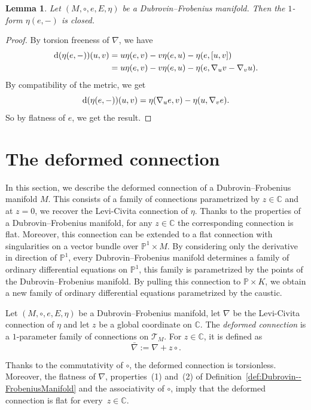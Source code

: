 \documentclass[10pt,a4paper]{amsart}
\numberwithin{equation}{section}
\newtheorem{Lemma}[Theorem]{Lemma}
\begin{document}
\begin{Lemma}
 \label{prop:Closedness}
 Let $(M,\circ,e,E,\eta)$ be a Dubrovin--Frobenius manifold. Then the $1$-form $\eta(e,-)$ is closed.
\end{Lemma}
\begin{proof}
 By torsion freeness of $\nabla$, we have
 \begin{align*}
 {\rm d}(\eta(e,-))(u,v)&=u\eta(e,v)-v\eta(e,u)-\eta(e,[u,v])\\
 &=u\eta(e,v)-v\eta(e,u)-\eta(e,\nabla_{u}v-\nabla_{v}u).
 \end{align*}
 By compatibility of the metric, we get
 \begin{equation*}
 {\rm d}(\eta(e,-))(u,v)=\eta(\nabla_{u}e,v)-\eta(u,\nabla_{v}e).
 \end{equation*}
 So by flatness of $e$, we get the result.
\end{proof}

\section{The deformed connection}
\label{sec:DeformedConnection}
In this section, we describe the deformed connection of a Dubrovin--Frobenius manifold $M$. This consists of a family of connections parametrized by $z\in\mathbb{C}$ and at $z=0$, we recover the Levi-Civita connection of $\eta$. Thanks to the properties of a Dubrovin--Frobenius manifold, for any $z\in\mathbb{C}$ the corresponding connection is flat. Moreover, this connection can be extended to a flat connection with singularities on a vector bundle over $\mathbb{P}^{1}\times M$. By considering only the derivative in direction of $\mathbb{P}^{1}$, every Dubrovin--Frobenius manifold determines a family of ordinary differential equations on $\mathbb{P}^{1}$, this family is parametrized by the points of the Dubrovin--Frobenius manifold. By pulling this connection to $\mathbb{P}\times K$, we obtain a new family of ordinary differential equations parametrized by the caustic.

\begin{Definition}
 Let $(M,\circ,e,E,\eta)$ be a Dubrovin--Frobenius manifold, let $\nabla$ be the Levi-Civita connection of $\eta$ and let $z$ be a global coordinate on $\mathbb{C}$. The \emph{deformed connection} is a $1$-parameter family of connections on $\mathcal{T}_{M}$. For $z\in\mathbb{C}$, it is defined as
 \begin{equation*}
 \bar{\nabla}:=\nabla + z\circ.
 \end{equation*}
\end{Definition}
Thanks to the commutativity of $\circ$, the deformed connection is torsionless. Moreover, the flatness of $\nabla$, properties~(1) and~(2) of Definition~\ref{def:Dubrovin--FrobeniusManifold} and the associativity of $\circ$, imply that the deformed connection is flat for every~$z\in\mathbb{C}$.
\end{document}
